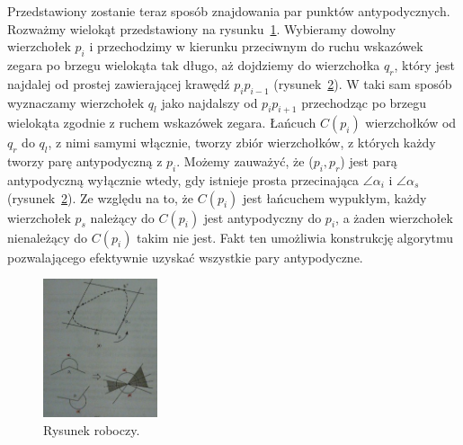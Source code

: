 \begin{figure}[htp]
  \centering
  \caption{\label{fig:antipodal}}
\end{figure}

Przedstawiony zostanie teraz sposób znajdowania par punktów
antypodycznych. Rozważmy wielokąt przedstawiony na
rysunku~\ref{fig:antipodal}. Wybieramy dowolny wierzchołek $p_i$ i
przechodzimy w kierunku przeciwnym do ruchu wskazówek zegara po brzegu
wielokąta tak długo, aż dojdziemy do wierzchołka $q_r$, który jest
najdalej od prostej zawierającej krawędź $p_{i}p_{i-1}$
(rysunek~\ref{fig:diameter}). W taki sam sposób wyznaczamy wierzchołek
$q_l$ jako najdalszy od $p_{i}p_{i+1}$ przechodząc po brzegu wielokąta
zgodnie z ruchem wskazówek zegara. Łańcuch $C(p_i)$ wierzchołków od
$q_r$ do $q_l$, z nimi samymi włącznie, tworzy zbiór wierzchołków, z
których każdy tworzy parę antypodyczną z $p_i$. Możemy zauważyć, że
($p_{i},p_{r}$) jest parą antypodyczną wyłącznie wtedy, gdy istnieje
prosta przecinająca $\angle \alpha_i$ i $\angle \alpha_s$
(rysunek~\ref{fig:diameter}). Ze względu na to, że $C(p_i)$ jest
łańcuchem wypukłym, każdy wierzchołek $p_s$ należący do $C(p_i)$ jest
antypodyczny do $p_i$, a żaden wierzchołek nienależący do $C(p_i)$
takim nie jest. Fakt ten umożliwia konstrukcję algorytmu pozwalającego
efektywnie uzyskać wszystkie pary antypodyczne.

\begin{figure}[htp]
  \centering
  \includegraphics[width=0.3\textwidth]{img/diameter}
  \caption{Rysunek roboczy.\label{fig:diameter}}
\end{figure}

